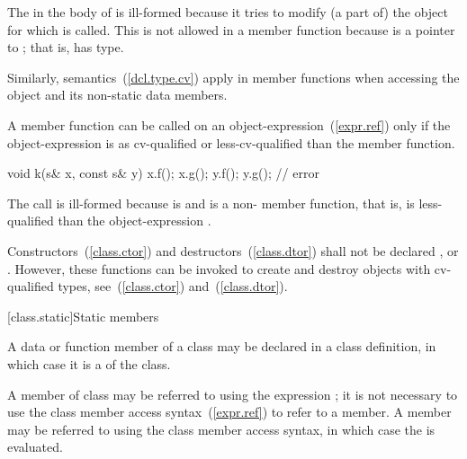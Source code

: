 The  in the body of  is ill-formed because it
tries to modify (a part of) the object for which  is
called. This is not allowed in a  member function because
 is a pointer to ; that is,  has
 type.
\exitexample

\pnum
Similarly,  semantics~(\ref{dcl.type.cv}) apply in
 member functions when accessing the object and its
non-static data members.

\pnum
A  member function can be called on an
object-expression~(\ref{expr.ref}) only if the object-expression is as
cv-qualified or less-cv-qualified than the member function.
\enterexample

\begin{codeblock}
void k(s& x, const s& y)
{
    x.f();
    x.g();
    y.f();
    y.g();                      // error
}
\end{codeblock}

The call  is ill-formed because  is 
and  is a non- member function, that is,
 is less-qualified than the object-expression .
\exitexample

\pnum
{}%
%
%
%
Constructors~(\ref{class.ctor}) and destructors~(\ref{class.dtor}) shall
not be declared ,  or 
. \enternote However, these functions can be invoked to
create and destroy objects with cv-qualified types,
see~(\ref{class.ctor}) and~(\ref{class.dtor}).
\exitnote

[class.static]{Static members}%
%
%

\pnum
A data or function member of a class may be declared  in a
class definition, in which case it is a  of the class.

\pnum
A  member  of class  may be referred to
using the  expression ; it is not
necessary to use the class member access syntax~(\ref{expr.ref}) to
refer to a  member. A  member may be
referred to using the class member access syntax, in which case the
 is evaluated.
\enterexample

